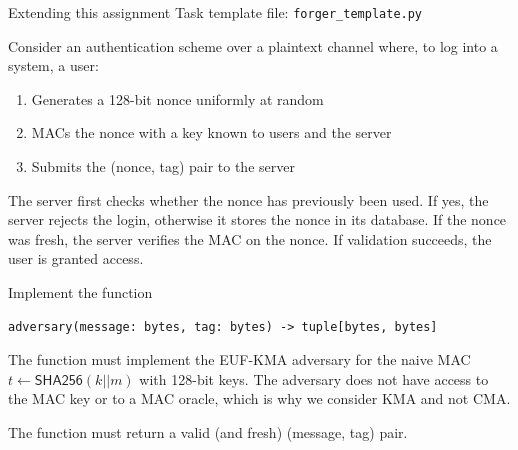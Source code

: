 \documentclass{homework}
\begin{document}
\begin{task}{Extending this assignment}
  Task template file: \texttt{forger\_template.py}

  Consider an authentication scheme over a plaintext channel where, to log into a system, a user:
  \begin{enumerate}
    \item Generates a 128-bit nonce uniformly at random
    \item MACs the nonce with a key known to users and the server
    \item Submits the (nonce, tag) pair to the server
  \end{enumerate}

  The server first checks whether the nonce has previously been used.
  If yes, the server rejects the login, otherwise it stores the nonce in its database.
  If the nonce was fresh, the server verifies the MAC on the nonce.
  If validation succeeds, the user is granted access.

  Implement the function
  \begin{Verbatim}
adversary(message: bytes, tag: bytes) -> tuple[bytes, bytes]
  \end{Verbatim}

  The function must implement the EUF-KMA adversary for the naive MAC $t \gets \mathsf{SHA256}(k||m)$ with 128-bit keys.
  The adversary does not have access to the MAC key or to a MAC oracle, which is why we consider KMA and not CMA.

  The function must return a valid (and fresh) (message, tag) pair.
\end{task}
\end{document}

